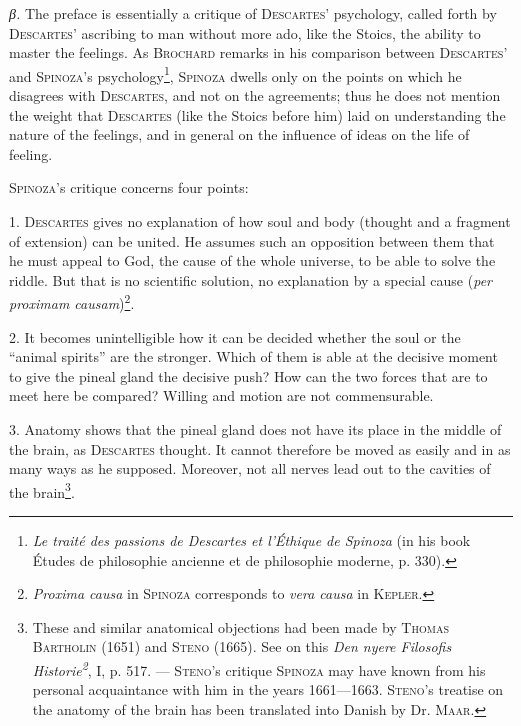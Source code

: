 \documentclass[12pt]{article}
\newcommand{\opage}[1]{\marginnote{\footnotesize\textit{[#1]}}}
\begin{document}
\opage{85}\textit{β.} The preface is essentially a critique of \textsc{Descartes}' psychology, called
forth by \textsc{Descartes}' ascribing to man without more ado, like the Stoics, the ability to
master the feelings. As \textsc{Brochard} remarks in his comparison between \textsc{Descartes}' and
\textsc{Spinoza}'s psychology\footnote{\textit{Le traité des passions de Descartes et l'Éthique de
Spinoza} (in his book Études de philosophie ancienne et de philosophie moderne, p. 330).},
\textsc{Spinoza} dwells only on the points on which he disagrees with \textsc{Descartes}, and not on
the agreements; thus he does not mention the weight that \textsc{Descartes} (like the Stoics before
him) laid on understanding the nature of the feelings, and in general on the influence of ideas on
the life of feeling.

\textsc{Spinoza}'s critique concerns four points:

1. \textsc{Descartes} gives no explanation of how soul and body (thought and a fragment of
extension) can be united. He assumes such an opposition between them that he must appeal to God,
the cause of the whole universe, to be able to solve the riddle. But that is no scientific solution,
no explanation by a special cause (\textit{per proximam causam})\footnote{\textit{Proxima causa} in
\textsc{Spinoza} corresponds to \textit{vera causa} in \textsc{Kepler}.}.

2. It becomes unintelligible how it can be decided whether the soul or the ``animal spirits'' are
the stronger. Which of them is able at the decisive moment to give the pineal gland the decisive
push? How can the two forces that are to meet here be compared? Willing and motion are not
commensurable. %

3. Anatomy shows that the pineal gland does not have its place in the middle of the brain, as
\textsc{Descartes} thought. It cannot therefore be moved as easily and in as many ways as he
supposed. Moreover, not all nerves lead out to the cavities of the brain\footnote{These and similar
anatomical objections had been made by \textsc{Thomas Bartholin} (1651) and \textsc{Steno} (1665).
See on this \textit{Den nyere Filosofis Historie\textsuperscript{2}}, I, p. 517. ---
\textsc{Steno}'s critique \textsc{Spinoza} may have known from his personal acquaintance with him in
the years 1661---1663. \textsc{Steno}'s treatise on the anatomy of the brain has been translated
into Danish by Dr. \textsc{Maar}.}.
\end{document}
